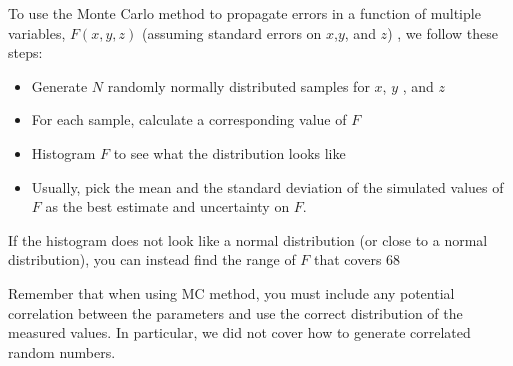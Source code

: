 \begin{chapterSummary}
To use the Monte Carlo method to propagate errors in a function of multiple variables, $F(x,y,z)$ (assuming standard errors on $x$,$ y$, and $z$) , we follow these steps:
\begin{itemize}
\item Generate $N$ randomly normally distributed samples for  $x$, $y$ , and $z$
\item For each sample, calculate a corresponding value of $F$
\item Histogram $F$ to see what the distribution looks like
\item Usually, pick the mean and the standard deviation of the simulated values of $F$ as the best estimate and uncertainty on $F$.
\end{itemize}
If the histogram does not look like a normal distribution (or close to a normal distribution), you can instead find the range of $F$ that covers 68%

Remember that when using MC method, you must include any potential correlation between the parameters and use the correct distribution of the measured values. In particular, we did not cover how to generate correlated random numbers.
\end{chapterSummary}

